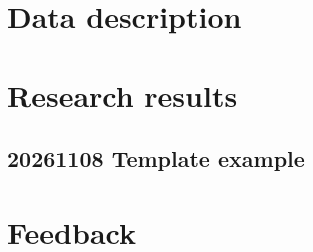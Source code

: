 \documentclass{report}
\numberwithin{equation}{section}
\numberwithin{figure}{section}
\numberwithin{table}{section}
\begin{document}
\chapter{Data description}

\chapter{Research results}
\section{20261108 Template example} 

\chapter{Feedback}


\end{document}
